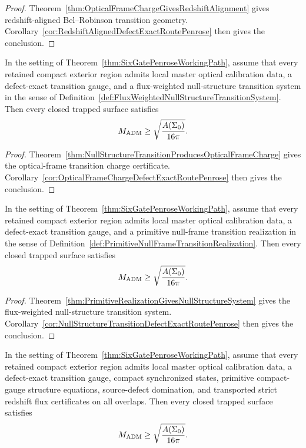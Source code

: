 \begin{proof}
Theorem~\ref{thm:OpticalFrameChargeGivesRedshiftAlignment} gives redshift-aligned Bel--Robinson transition geometry. Corollary~\ref{cor:RedshiftAlignedDefectExactRoutePenrose} then gives the conclusion.
\end{proof}

\begin{corollary}\label{cor:NullStructureTransitionDefectExactRoutePenrose}
In the setting of Theorem~\ref{thm:SixGatePenroseWorkingPath}, assume that every retained compact exterior region admits local master optical calibration data, a defect-exact transition gauge, and a flux-weighted null-structure transition system in the sense of Definition~\ref{def:FluxWeightedNullStructureTransitionSystem}. Then every closed trapped surface satisfies
\[
    M_{\mathrm{ADM}}\ge \sqrt{\frac{A(\Sigma_0)}{16\pi}} .
\]
\end{corollary}

\begin{proof}
Theorem~\ref{thm:NullStructureTransitionProducesOpticalFrameCharge} gives the optical-frame transition charge certificate. Corollary~\ref{cor:OpticalFrameChargeDefectExactRoutePenrose} then gives the conclusion.
\end{proof}

\begin{corollary}\label{cor:PrimitiveNullFrameDefectExactRoutePenrose}
In the setting of Theorem~\ref{thm:SixGatePenroseWorkingPath}, assume that every retained compact exterior region admits local master optical calibration data, a defect-exact transition gauge, and a primitive null-frame transition realization in the sense of Definition~\ref{def:PrimitiveNullFrameTransitionRealization}. Then every closed trapped surface satisfies
\[
    M_{\mathrm{ADM}}\ge \sqrt{\frac{A(\Sigma_0)}{16\pi}} .
\]
\end{corollary}

\begin{proof}
Theorem~\ref{thm:PrimitiveRealizationGivesNullStructureSystem} gives the flux-weighted null-structure transition system. Corollary~\ref{cor:NullStructureTransitionDefectExactRoutePenrose} then gives the conclusion.
\end{proof}

\begin{corollary}\label{cor:StrictRedshiftLocalRoutePenrose}
In the setting of Theorem~\ref{thm:SixGatePenroseWorkingPath}, assume that every retained compact exterior region admits local master optical calibration data, a defect-exact transition gauge, compact synchronized states, primitive compact-gauge structure equations, source-defect domination, and transported strict redshift flux certificates on all overlaps. Then every closed trapped surface satisfies
\[
    M_{\mathrm{ADM}}\ge \sqrt{\frac{A(\Sigma_0)}{16\pi}} .
\]
\end{corollary}

